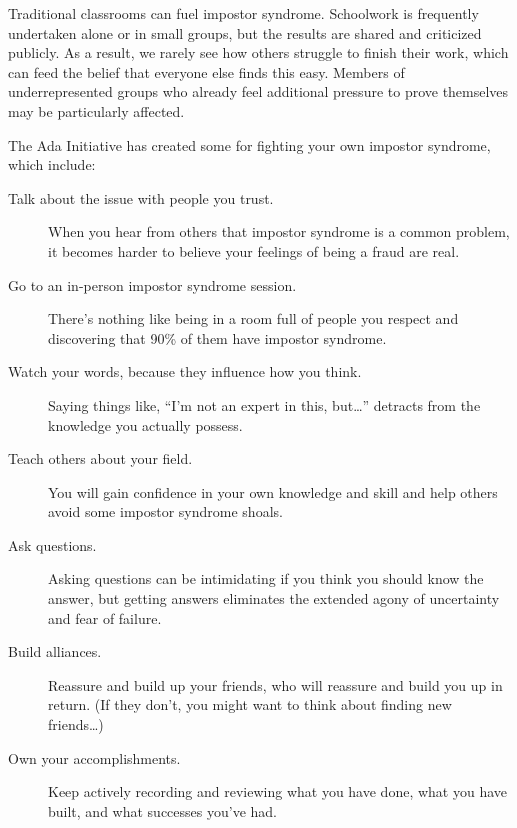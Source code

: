 Traditional classrooms can fuel impostor syndrome.
Schoolwork is frequently undertaken alone or in small groups,
but the results are shared and criticized publicly.
As a result,
we rarely see how others struggle to finish their work,
which can feed the belief that everyone else finds this easy.
Members of underrepresented groups who already feel additional pressure to prove themselves
may be particularly affected.

The Ada Initiative has created some
for fighting your own impostor syndrome,
which include:

\begin{description}

\item[Talk about the issue with people you trust.]
  When you hear from others that impostor syndrome is a common problem,
  it becomes harder to believe your feelings of being a fraud are real.

\item[Go to an in-person impostor syndrome session.]
  There's nothing like being in a room full of people you respect
  and discovering that 90\% of them have impostor syndrome.

\item[Watch your words, because they influence how you think.]
  Saying things like,
  ``I'm not an expert in this, but{\ldots}''
  detracts from the knowledge you actually possess.

\item[Teach others about your field.]
  You will gain confidence in your own knowledge and skill
  and help others avoid some impostor syndrome shoals.

\item[Ask questions.]
  Asking questions can be intimidating if you think you should know the answer,
  but getting answers eliminates the extended agony of uncertainty and fear of failure.

\item[Build alliances.]
  Reassure and build up your friends,
  who will reassure and build you up in return.
  (If they don't, you might want to think about finding new friends{\ldots})

\item[Own your accomplishments.]
  Keep actively recording and reviewing what you have done,
  what you have built,
  and what successes you've had.

\end{description}

